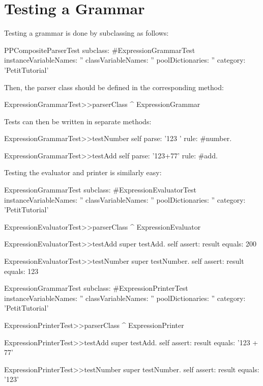 \documentclass[a4paper,10pt,twoside]{book}
\begin{document}
\section{Testing a Grammar}

Testing a grammar is done by subclassing  as
follows:

\begin{code}{}
PPCompositeParserTest subclass: #ExpressionGrammarTest
  instanceVariableNames: ''
  classVariableNames: ''
  poolDictionaries: ''
  category: 'PetitTutorial'
\end{code}

Then, the parser class should be defined in the corresponding method:

\begin{code}{}
ExpressionGrammarTest>>parserClass
  ^ ExpressionGrammar
\end{code}

Tests can then be written in separate methods:

\begin{code}{}
ExpressionGrammarTest>>testNumber
  self parse: '123 ' rule: #number.

ExpressionGrammarTest>>testAdd
  self parse: '123+77' rule: #add.
\end{code}

Testing the evaluator and printer is similarly easy:

\begin{code}{}
ExpressionGrammarTest subclass: #ExpressionEvaluatorTest
  instanceVariableNames: ''
  classVariableNames: ''
  poolDictionaries: ''
  category: 'PetitTutorial'

ExpressionEvaluatorTest>>parserClass
  ^ ExpressionEvaluator 

ExpressionEvaluatorTest>>testAdd
  super testAdd.
  self assert: result equals: 200

ExpressionEvaluatorTest>>testNumber
  super testNumber.
  self assert: result equals: 123

ExpressionGrammarTest subclass: #ExpressionPrinterTest
  instanceVariableNames: ''
  classVariableNames: ''
  poolDictionaries: ''
  category: 'PetitTutorial'

ExpressionPrinterTest>>parserClass
  ^ ExpressionPrinter 

ExpressionPrinterTest>>testAdd
  super testAdd.
  self assert: result equals: '123 + 77'

ExpressionPrinterTest>>testNumber
  super testNumber.
  self assert: result equals: '123'
\end{code}
\end{document}
